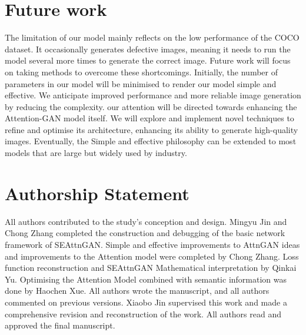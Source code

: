 \documentclass[runningheads, orivec]{llncs}
\begin{document}
\section{Future work}
\vspace{-8pt}
The limitation of our model mainly reflects on the low performance of the COCO dataset. It occasionally generates defective images, meaning it needs to run the model several more times to generate the correct image. Future work will focus on taking methods to overcome these shortcomings. Initially, the number of parameters in our model will be minimised to render our model simple and effective. We anticipate improved performance and more reliable image generation by reducing the complexity. our attention will be directed towards enhancing the Attention-GAN model itself. We will explore and implement novel techniques to refine and optimise its architecture, enhancing its ability to generate high-quality images. Eventually, the Simple and effective philosophy can be extended to most models that are large but widely used by industry.
\vspace{-10pt}
\section{Authorship Statement}
\vspace{-8pt}
All authors contributed to the study's conception and design. Mingyu Jin and Chong Zhang completed the construction and debugging of the basic network framework of SEAttnGAN. Simple and effective improvements to AttnGAN ideas and improvements to the Attention model were completed by Chong Zhang. Loss function reconstruction and SEAttnGAN Mathematical interpretation by Qinkai Yu. Optimising the Attention Model combined with semantic information was done by Haochen Xue. All authors wrote the manuscript, and all authors commented on previous versions. Xiaobo Jin supervised this work and made a comprehensive revision and reconstruction of the work. All authors read and approved the final manuscript.




\end{document}
